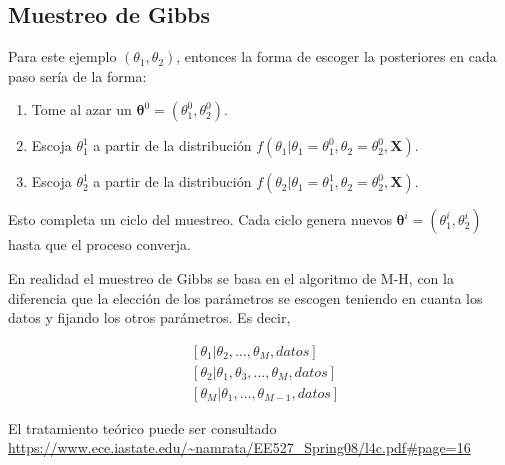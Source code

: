 \documentclass[
  12pt,
]{book}
\providecommand{\tightlist}{%
  \setlength{\itemsep}{0pt}\setlength{\parskip}{0pt}}
\theoremstyle{definition}
\theoremstyle{definition}
\theoremstyle{definition}
\theoremstyle{remark}
\let\BeginKnitrBlock\begin \let\EndKnitrBlock\end
\begin{document}
\hypertarget{muestreo-de-gibbs}{%
\subsection{Muestreo de Gibbs}\label{muestreo-de-gibbs}}

Para este ejemplo \(\left( \theta_{1},\theta_{2} \right)\), entonces la forma de escoger la posteriores en cada paso sería de la forma:

\begin{enumerate}
\def\labelenumi{\arabic{enumi}.}
\tightlist
\item
  Tome al azar un \(\boldsymbol{\theta}^{0} = \left( \theta_{1}^{0},\theta_{2}^{0} \right)\).
\item
  Escoja \(\theta_{1}^{1}\) a partir de la distribución
  \(f\left(\theta_{1} \vert \theta_{1}=\theta_{1}^{0}, \theta_{2}=\theta_{2}^{0}, \boldsymbol{X} \right)\).
\item
  Escoja \(\theta_{2}^{1}\) a partir de la distribución
  \(f\left(\theta_{2} \vert \theta_{1}=\theta_{1}^{1}, \theta_{2}=\theta_{2}^{0}, \boldsymbol{X} \right)\).
\end{enumerate}

Esto completa un ciclo del muestreo. Cada ciclo genera nuevos \(\boldsymbol{\theta}^{i} = \left( \theta_{1}^{i},\theta_{2}^{i} \right)\) hasta que el proceso converja.

\BeginKnitrBlock{remark}
{}En realidad el muestreo de Gibbs se basa en el algoritmo de M-H, con la diferencia que la elección de los parámetros se escogen teniendo en cuanta los datos y fijando los otros parámetros. Es decir,

\begin{align*}
&{\left[\theta_{1} | \theta_{2}, \ldots, \theta_{M}, datos \right]} \\
&{\left[\theta_{2} | \theta_{1}, \theta_{3}, \ldots, \theta_{M}, datos \right]} \\
&{\left[\theta_{M} | \theta_{1}, \ldots, \theta_{M-1}, datos \right]}
\end{align*}
\EndKnitrBlock{remark}

El tratamiento teórico puede ser consultado \url{https://www.ece.iastate.edu/~namrata/EE527_Spring08/l4c.pdf\#page=16}
\end{document}
